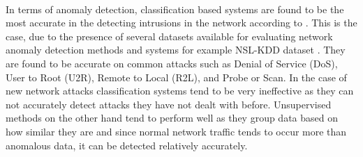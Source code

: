 \paragraph{}
In terms of anomaly detection, classification based systems are found to be the most accurate in the detecting intrusions in the network according to \cite{AHMED201619}\cite{6524462}. This is the case, due to the presence of several datasets available for evaluating network anomaly detection methods and systems for example NSL-KDD dataset \cite{6524462}. They are found to be accurate on common attacks such as Denial
of Service (DoS), User to Root (U2R), Remote to Local (R2L),
and Probe or Scan\cite{7307098}. In the case of new network attacks classification systems tend to be very ineffective as they can not accurately detect attacks they have not dealt with before\cite{AHMED201619}. Unsupervised methods on the other hand tend to perform well as they group data based on how similar they are and since normal network traffic tends to occur more than anomalous data, it can be detected relatively accurately\cite{8357700}.  
 